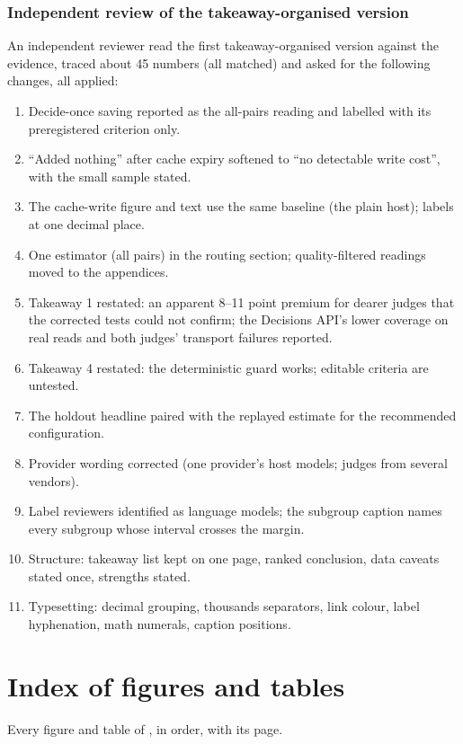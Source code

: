 \documentclass[11pt,letterpaper]{article}
\newcommand{\thesupp}{the appendices}\newcommand{\Thesupp}{The appendices}\newcommand{\suppword}{appendices}
\begin{document}
\subsubsection{Independent review of the takeaway-organised version}
An independent reviewer read the first takeaway-organised version against the evidence, traced about 45 numbers (all
matched) and asked for the following changes, all applied:
\begin{enumerate}[leftmargin=1.6em]
  \item Decide-once saving reported as the all-pairs reading and labelled with its preregistered criterion only.
  \item ``Added nothing'' after cache expiry softened to ``no detectable write cost'', with the small sample stated.
  \item The cache-write figure and text use the same baseline (the plain host); labels at one decimal place.
  \item One estimator (all pairs) in the routing section; quality-filtered readings moved to \thesupp{}.
  \item Takeaway 1 restated: an apparent 8--11 point premium for dearer judges that the corrected tests could not
    confirm; the Decisions API's lower coverage on real reads and both judges' transport failures reported.
  \item Takeaway 4 restated: the deterministic guard works; editable criteria are untested.
  \item The holdout headline paired with the replayed estimate for the recommended configuration.
  \item Provider wording corrected (one provider's host models; judges from several vendors).
  \item Label reviewers identified as language models; the subgroup caption names every subgroup whose interval
    crosses the margin.
  \item Structure: takeaway list kept on one page, ranked conclusion, data caveats stated once, strengths stated.
  \item Typesetting: decimal grouping, thousands separators, link colour, label hyphenation, math numerals, caption
    positions.
\end{enumerate}
\section{Index of figures and tables}\label{sec:index}
Every figure and table of \thissupp{}, in order, with its page.
\begingroup
\renewcommand{\listfigurename}{Figures}\renewcommand{\listtablename}{Tables}
\let\clearpage\relax
\small
\renewcommand{\section}[2]{\subsection*{#2}}
\listoffigures
\listoftables
\endgroup
 
\end{document}
